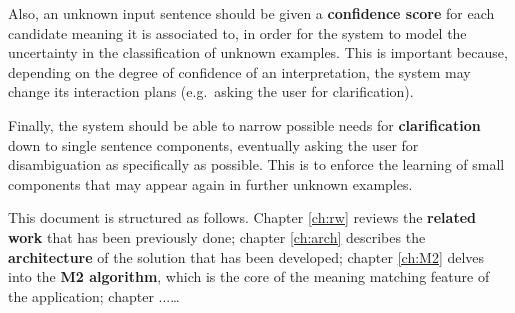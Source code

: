 Also, an unknown input sentence should be given a \textbf{confidence score} for each candidate meaning it is associated to, in order for the system to model the uncertainty in the classification of unknown examples. This is important because, depending on the degree of confidence of an interpretation, the system may change its interaction plans (e.g.\ asking the user for clarification).

Finally, the system should be able to narrow possible needs for \textbf{clarification} down to single sentence components, eventually asking the user for disambiguation as specifically as possible. This is to enforce the learning of small components that may appear again in further unknown examples.

This document is structured as follows. Chapter \ref{ch:rw} reviews the \textbf{related work} that has been previously done; chapter \ref{ch:arch} describes the \textbf{architecture} of the solution that has been developed; chapter \ref{ch:M2} delves into the \textbf{M2 algorithm}, which is the core of the meaning matching feature of the application; chapter ...\ldots
